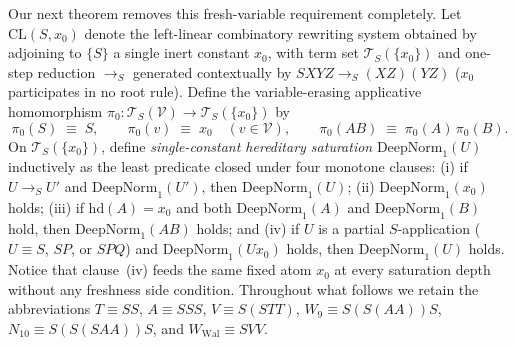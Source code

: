 \documentclass[11pt,reqno]{amsart}
\numberwithin{equation}{section}
\theoremstyle{plain}
\theoremstyle{definition}
\theoremstyle{remark}
\newcommand{\TS}{\mathcal{T}_S}
\newcommand{\TSV}{\mathcal{T}_S(\mathcal{V})}
\newcommand{\redS}{\to_S}
\begin{document}
Our next theorem removes this fresh-variable requirement completely. Let $\mathrm{CL}(S, x_0)$ denote the left-linear combinatory rewriting system obtained by adjoining to $\{S\}$ a single inert constant $x_0$, with term set $\TS(\{x_0\})$ and one-step reduction $\redS$ generated contextually by $S X Y Z \redS (X Z)(Y Z)$ ($x_0$ participates in no root rule). Define the variable-erasing applicative homomorphism $\pi_0 \colon \TSV \to \TS(\{x_0\})$ by
\[
  \pi_0(S) \;\equiv\; S, \qquad \pi_0(v) \;\equiv\; x_0 \quad (v \in \mathcal{V}), \qquad \pi_0(A B) \;\equiv\; \pi_0(A)\,\pi_0(B).
\]
On $\TS(\{x_0\})$, define \emph{single-constant hereditary saturation} $\mathrm{DeepNorm}_1(U)$ inductively as the least predicate closed under four monotone clauses: (i) if $U \redS U'$ and $\mathrm{DeepNorm}_1(U')$, then $\mathrm{DeepNorm}_1(U)$; (ii) $\mathrm{DeepNorm}_1(x_0)$ holds; (iii) if $\mathrm{hd}(A) = x_0$ and both $\mathrm{DeepNorm}_1(A)$ and $\mathrm{DeepNorm}_1(B)$ hold, then $\mathrm{DeepNorm}_1(A B)$ holds; and (iv) if $U$ is a partial $S$-application ($U \equiv S$, $S P$, or $S P Q$) and $\mathrm{DeepNorm}_1(U x_0)$ holds, then $\mathrm{DeepNorm}_1(U)$ holds. Notice that clause~(iv) feeds the same fixed atom $x_0$ at every saturation depth without any freshness side condition. Throughout what follows we retain the abbreviations $T \equiv S S$, $A \equiv S S S$, $V \equiv S(S T T)$, $W_9 \equiv S(S(A A))S$, $N_{10} \equiv S(S(S A A))S$, and $W_{\mathrm{Wal}} \equiv S V V$.
\end{document}
